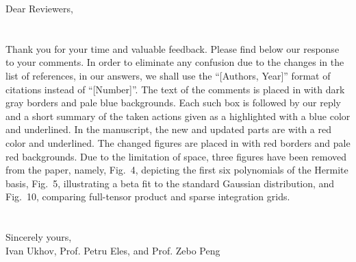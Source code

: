 Dear Reviewers,
\\
\\
\\
\noindent Thank you for your time and valuable feedback.
Please find below our response to your comments.
In order to eliminate any confusion due to the changes in the list of references, in our answers, we shall use the ``[Authors, Year]'' format of citations instead of ``[Number]''.
The text of the comments is placed in  with dark gray borders and pale blue backgrounds.
Each such box is followed by our reply and a short summary of the taken actions given as a  highlighted with a blue color and underlined.
In the manuscript, the new and updated parts are  with a red color and underlined.
The changed figures are placed in  with red borders and pale red backgrounds.
Due to the limitation of space, three figures have been removed from the paper, namely, Fig.~4, depicting the first six polynomials of the Hermite basis, Fig.~5, illustrating a beta fit to the standard Gaussian distribution, and Fig.~10, comparing full-tensor product and sparse integration grids.
\\
\\
\\
\noindent Sincerely yours,\\
Ivan Ukhov, Prof. Petru Eles, and Prof. Zebo Peng
